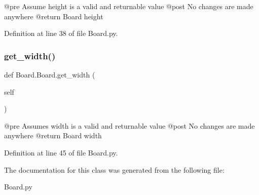 \begin{DoxyVerb}@pre    Assume height is a valid and returnable value
    @post   No changes are made anywhere
    @return Board height
\end{DoxyVerb}
 

Definition at line 38 of file Board.\+py.

\mbox{\label{class_board_1_1_board_a5461757505c80b532af77cc6a651c7a7}} 
\subsubsection{\texorpdfstring{get\+\_\+width()}{get\_width()}}
{\footnotesize\ttfamily def Board.\+Board.\+get\+\_\+width (\begin{DoxyParamCaption}\item[{}]{self }\end{DoxyParamCaption})}

\begin{DoxyVerb}@pre    Assumes width is a valid and returnable value
    @post   No changes are made anywhere
    @return Board width
\end{DoxyVerb}
 

Definition at line 45 of file Board.\+py.



The documentation for this class was generated from the following file\+:\begin{DoxyCompactItemize}
\item 
Board.\+py\end{DoxyCompactItemize}
